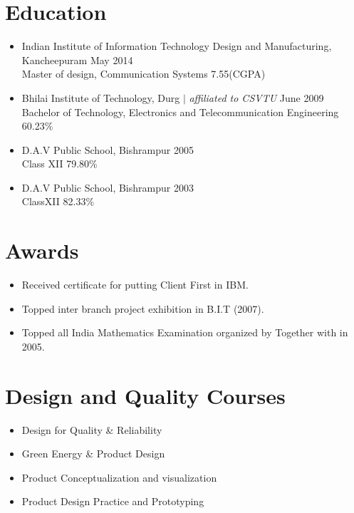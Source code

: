 \documentclass[letterpaper, 12 pt]{article}
\begin{document}
			\section{Education}
				\begin{itemize}[noitemsep]
					\item {{Indian Institute of Information Technology Design and Manufacturing, Kancheepuram} \hfill {May 2014}\\{Master of design, Communication Systems} \hfill {7.55(CGPA)}} 
					\item {Bhilai Institute of Technology, Durg $|$ \textit{affiliated to CSVTU}} \hfill {June 2009}\\{Bachelor of Technology, Electronics and Telecommunication Engineering} \hfill {60.23\%}
					\item  {{D.A.V Public School, Bishrampur} \hfill {2005}\\{Class XII} \hfill {79.80\%}}
					\item {{D.A.V Public School, Bishrampur} \hfill {2003}\\ {ClassXII} \hfill {82.33\%}}		
					
				\end{itemize}
			\section{Awards}
				\begin{itemize}[noitemsep]
					\item {Received certificate for putting Client First in IBM.}
					\item {Topped inter branch project exhibition in B.I.T (2007).}
					\item {Topped all India Mathematics Examination organized by Together with in 2005.}
				\end{itemize}
		
		\section{Design and Quality Courses}
			\begin{itemize}[noitemsep]
				\item Design for Quality \& Reliability
				\item Green Energy \& Product Design
				\item Product Conceptualization and visualization
				\item Product Design Practice and Prototyping
				
			\end{itemize}
	
\end{document}
